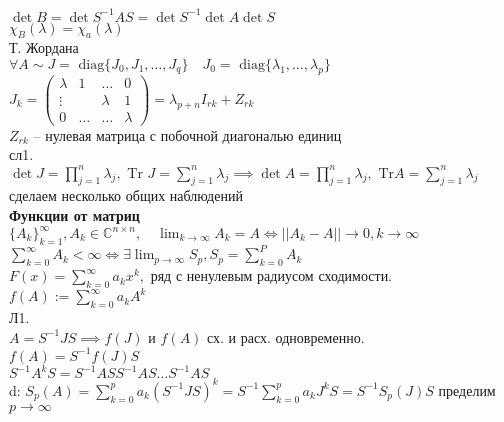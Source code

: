 \documentclass[12pt, a4paper]{article}
\begin{document}
    $\det B = \det S^{-1}AS = \det S^{-1}\det A\det S$\\
    $\chi_B(\lambda) = \chi_a(\lambda)$\\

    Т. Жордана\\

    $\forall A \sim J = \text{ diag} \{ J_0, J_1, \dotsc, J_q\} \quad
    J_0 = \text{ diag}\{\lambda_1, \dotsc, \lambda_p \}
    $\\
    $J_k = \left(\begin{matrix}
        \lambda & 1 & \dotsc & 0 \\
        \vdots & & \lambda & 1 \\
        0 & \dotsc & \dotsc & \lambda
    \end{matrix}\right) = \lambda_{p+n} I_{rk} + Z_{rk}$\\  %
    $Z_{rk}$ -- нулевая матрица с побочной диагональю единиц\\

    сл1.\\
    $\det J = \prod^n_{j=1}\lambda_j, \text{ Tr } J = \sum^n_{j=1}\lambda_j \implies
    \det A = \prod_{j=1}^n \lambda_j, \text{ Tr} A = \sum^n_{j=1}\lambda_j
    $\\

    сделаем несколько общих наблюдений\\
    
    \textbf{Функции от матриц}\\
    $\{A_k\}_{k=1}^\infty, A_k \in \mathbb{C}^{n\times n}, \quad \lim_{k \to \infty} A_k = A \iff ||A_k - A|| \to 0, k \to \infty$\\
    $\sum^\infty_{k=0} A_k < \infty \iff \exists \lim_{p \to \infty}S_p, S_p = \sum^P_{k=0}A_k$\\

    $F(x) = \sum^\infty_{k=0} a_k x^k, $ ряд с ненулевым радиусом сходимости.\\
    $f(A) := \sum^\infty_{k=0}a_k A^k$\\
    Л1.\\
    $A = S^{-1}JS \implies f(J)$ и $f(A)$ сх. и расх. одновременно.\\
    $f(A) = S^{-1}f(J)S$\\
    $S^{-1}A^k S = S^{-1}ASS^{-1}AS \dotsc S^{-1}AS$\\
    d:
    $S_p (A) = \sum^p_{k=0} a_k (S^{-1}JS)^k = S^{-1} \sum^p_{k=0} a_k J^kS = 
    S^{-1}S_p(J)S 
    $ пределим $p \to \infty$\\
\end{document}

